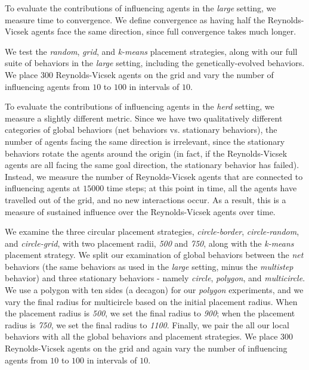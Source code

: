 To evaluate the contributions of influencing agents in the \textit{large}
setting, we measure time to convergence.
We define convergence as having half the Reynolds-Vicsek agents face the same
direction, since full convergence takes much longer.

We test the \textit{random}, \textit{grid}, and \textit{k-means} placement
strategies, along with our full suite of behaviors in the \textit{large}
setting, including the genetically-evolved behaviors.
We place $300$ Reynolds-Vicsek agents on the grid and vary
the number of influencing agents from $10$ to $100$ in intervals of $10$.

To evaluate the contributions of influencing agents in the \textit{herd}
setting, we measure a slightly different metric.
Since we have two qualitatively different categories of global behaviors (net
behaviors vs. stationary behaviors), the number of agents facing the same
direction is irrelevant, since the stationary behaviors rotate the agents around
the origin (in fact, if the Reynolds-Vicsek agents are all facing the same
goal direction, the stationary behavior has failed).
Instead, we measure the number of Reynolds-Vicsek agents that are connected to
influencing agents at $15000$ time steps; at this point in time, all the agents
have travelled out of the grid, and no new interactions occur.
As a result, this is a measure of sustained influence over the Reynolds-Vicsek
agents over time.

We examine the three circular placement strategies, \textit{circle-border},
\textit{circle-random}, and \textit{circle-grid}, with two placement radii,
\textit{500} and \textit{750}, along with the \textit{k-means} placement
strategy.
We split our examination of global behaviors between the \textit{net} behaviors
(the same behaviors as used in the \textit{large} setting, minus the
\textit{multistep} behavior) and three stationary behaviors - namely
\textit{circle}, \textit{polygon}, and \textit{multicircle}.
We use a polygon with ten sides (a decagon) for our \textit{polygon}
experiments, and we vary the final radius for multicircle based on the initial
placement radius.
When the placement radius is \textit{500}, we set the final radius to
\textit{900}; when the placement radius is \textit{750}, we set the final
radius to \textit{1100}.
Finally, we pair the all our local behaviors with all the global behaviors and
placement strategies.
We place $300$ Reynolds-Vicsek agents on the grid and again vary the number of
influencing agents from $10$ to $100$ in intervals of $10$.


